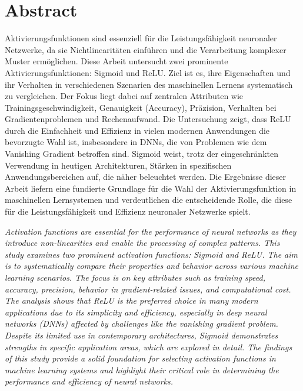 
\chapter{Abstract}
Aktivierungsfunktionen sind essenziell für die Leistungsfähigkeit neuronaler Netzwerke, da sie Nichtlinearitäten einführen und die Verarbeitung komplexer Muster ermöglichen. Diese Arbeit untersucht zwei prominente Aktivierungsfunktionen: Sigmoid und ReLU. Ziel ist es, ihre Eigenschaften und ihr Verhalten in verschiedenen Szenarien des maschinellen Lernens systematisch zu vergleichen. Der Fokus liegt dabei auf zentralen Attributen wie Trainingsgeschwindigkeit, Genauigkeit (Accuracy), Präzision, Verhalten bei Gradientenproblemen und Rechenaufwand.
Die Untersuchung zeigt, dass ReLU durch die Einfachheit und Effizienz in vielen modernen Anwendungen die bevorzugte Wahl ist, insbesondere in DNNs, die von Problemen wie dem Vanishing Gradient betroffen sind. Sigmoid weist, trotz der eingeschränkten Verwendung in heutigen Architekturen, Stärken in spezifischen Anwendungsbereichen auf, die näher beleuchtet werden.
Die Ergebnisse dieser Arbeit liefern eine fundierte Grundlage für die Wahl der Aktivierungsfunktion in maschinellen Lernsystemen und verdeutlichen die entscheidende Rolle, die diese für die Leistungsfähigkeit und Effizienz neuronaler Netzwerke spielt.

\textit{
Activation functions are essential for the performance of neural networks as they introduce non-linearities and enable the processing of complex patterns. This study examines two prominent activation functions: Sigmoid and ReLU. The aim is to systematically compare their properties and behavior across various machine learning scenarios. The focus is on key attributes such as training speed, accuracy, precision, behavior in gradient-related issues, and computational cost.
The analysis shows that ReLU is the preferred choice in many modern applications due to its simplicity and efficiency, especially in deep neural networks (DNNs) affected by challenges like the vanishing gradient problem. Despite its limited use in contemporary architectures, Sigmoid demonstrates strengths in specific application areas, which are explored in detail.
The findings of this study provide a solid foundation for selecting activation functions in machine learning systems and highlight their critical role in determining the performance and efficiency of neural networks.
}




